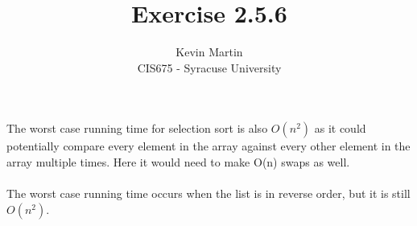 \documentclass{article}
\author{Kevin Martin\\ CIS675 - Syracuse University}
\title{Exercise 2.5.6}
\begin{document}
\maketitle
The worst case running time for selection sort is also \(O(n^2)\) as it could potentially compare every element in the array 
against every other element in the array multiple times. Here it would need to make O(n) swaps as well. \\\\
The worst case running time occurs when the list is in reverse order, but it is still \(O(n^2)\).
\end{document}
